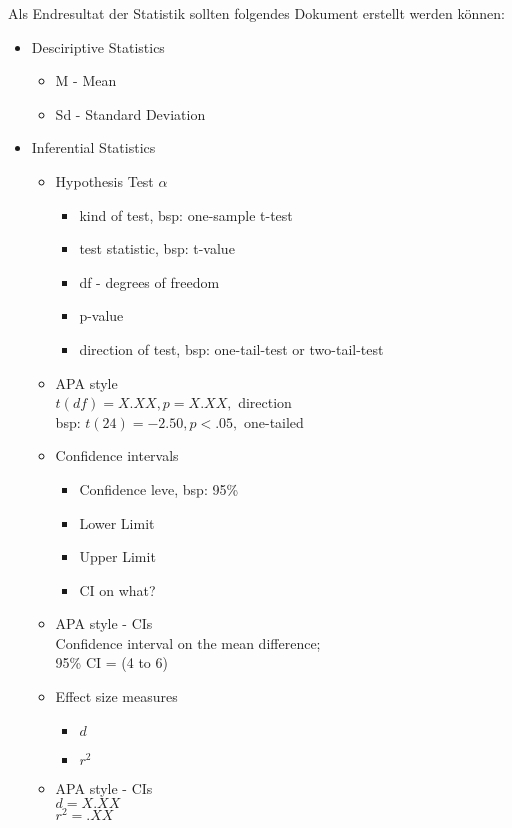 \documentclass[landscape]{article}
\begin{document}
		Als Endresultat der Statistik sollten folgendes Dokument erstellt werden können:
		\begin{itemize}
			\item Desciriptive Statistics
				\begin{itemize}
					\item M - Mean
					\item Sd - Standard Deviation
				\end{itemize}
			\item Inferential Statistics
				\begin{itemize}
					\item Hypothesis Test \(\alpha\)
					\begin{itemize}
						\item kind of test, bsp: one-sample t-test
						\item test statistic, bsp: t-value
						\item df - degrees of freedom
						\item p-value
						\item direction of test, bsp: one-tail-test or two-tail-test
					\end{itemize}
					\item APA style
						  \\\(t(df) = X.XX, p = X.XX,\) direction
						  \\bsp: \(t(24) = -2.50, p < .05,\) one-tailed
					\item Confidence intervals
					\begin{itemize}
						\item Confidence leve, bsp: 95\%
						\item Lower Limit
						\item Upper Limit
						\item CI on what?
					\end{itemize}
					\item APA style - CIs
						  \\Confidence interval on the mean difference;
						  \\95\% CI = (4 to 6)
					\item Effect size measures
						\begin{itemize}
							\item \(d\)
							\item \(r^2\)
						\end{itemize}
					\item APA style - CIs
						  \\\(d = X.XX\)
						  \\\(r^2 = .XX\)

				\end{itemize}
		\end{itemize}
\end{document}

